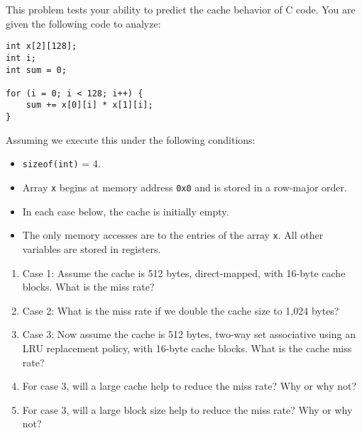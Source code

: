 \documentclass[12pt]{article}
\newenvironment{ex}[2][Exercise]{\begin{trivlist}
		\item[\hskip \labelsep {\bfseries #1}\hskip \labelsep {\bfseries #2.}]}{\end{trivlist}}
\begin{document}
\begin{ex}{6.36}
	This problem tests your ability to predict the cache behavior of C code. You are given the following
	code to analyze:
	\begin{lstlisting}
int x[2][128];
int i;
int sum = 0;

for (i = 0; i < 128; i++) {
	sum += x[0][i] * x[1][i];
}
	\end{lstlisting}
	Assuming we execute this under the following conditions:
	\begin{itemize}
		\item \texttt{sizeof(int)} = 4.
		\item Array \texttt{x} begins at memory address \texttt{0x0} and is stored in a row-major order.
		\item In each case below, the cache is initially empty.
		\item The only memory accesses are to the entries of the array \texttt{x}. All other variables are
		stored in registers.
	\end{itemize}
	\begin{enumerate}[label=(\alph*)]
		\item Case 1: Assume the cache is 512 bytes, direct-mapped, with 16-byte cache blocks. What is the
		miss rate?
		\item Case 2: What is the miss rate if we double the cache size to 1,024 bytes?
		\item Case 3: Now assume the cache is 512 bytes, two-way set associative using an LRU replacement
		policy, with 16-byte cache blocks. What is the cache miss rate?
		\item For case 3, will a large cache help to reduce the miss rate? Why or why not?
		\item For case 3, will a large block size help to reduce the miss rate? Why or why not?
	\end{enumerate}
\end{ex}
\end{document}
